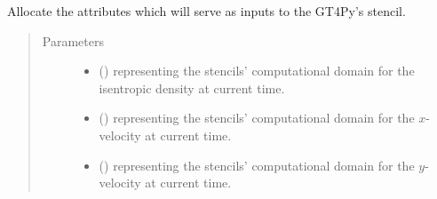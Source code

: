 \documentclass[letterpaper,10pt,english]{sphinxmanual}
\begin{document}
\begin{fulllineitems}
\begin{fulllineitems}
\label{\detokenize{api:dycore.prognostic_isentropic_centered.PrognosticIsentropicCentered._stencils_stepping_by_neglecting_vertical_advection_allocate_inputs}}
Allocate the attributes which will serve as inputs to the GT4Py’s stencil.
\begin{quote}\begin{description}
\item[{Parameters}] \leavevmode\begin{itemize}
\item {} 
 () \textendash{}  representing the stencils’ computational domain for the isentropic density at current time.

\item {} 
 () \textendash{}  representing the stencils’ computational domain for the \(x\)-velocity at current time.

\item {} 
 () \textendash{}  representing the stencils’ computational domain for the \(y\)-velocity at current time.

\end{itemize}

\end{description}\end{quote}

\end{fulllineitems}



\end{fulllineitems}
\end{document}
